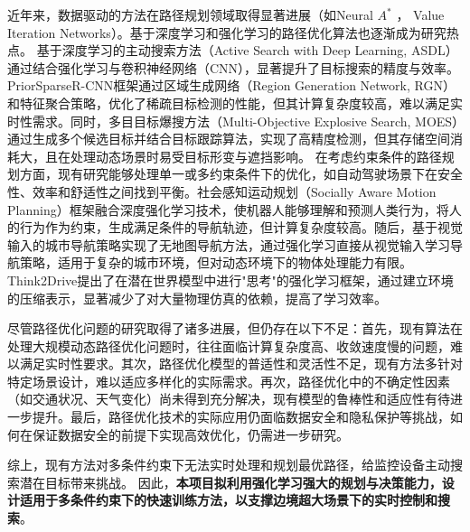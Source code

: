 近年来，数据驱动的方法在路径规划领域取得显著进展（如Neural $A^{\ast}$ \cite{Archetti_2022}， Value Iteration Networks\cite{tamar2017valueiterationnetworks}）。基于深度学习和强化学习的路径优化算法也逐渐成为研究热点\cite{zheng2023distributed,cui2024multi,fang2024improved}。
基于深度学习的主动搜索方法\cite{DBLP:conf/iclr/HottungKT22}（Active Search with Deep Learning, ASDL）通过结合强化学习与卷积神经网络（CNN），显著提升了目标搜索的精度与效率。
PriorSparseR-CNN框架\cite{wang2024priorsparse}通过区域生成网络（Region Generation Network, RGN）和特征聚合策略，优化了稀疏目标检测的性能，但其计算复杂度较高，难以满足实时性需求。同时，多目目标爆搜方法（Multi-Objective Explosive Search, MOES）\cite{moes2024}通过生成多个候选目标并结合目标跟踪算法，实现了高精度检测，但其存储空间消耗大，且在处理动态场景时易受目标形变与遮挡影响。
在考虑约束条件的路径规划方面，现有研究能够处理单一或多约束条件下的优化，如自动驾驶场景下在安全性、效率和舒适性之间找到平衡\cite{yang2019generalizedalgorithmmultiobjectivereinforcement}。社会感知运动规划\cite{DBLP:conf/iros/ChenELH17}（Socially Aware Motion Planning）框架融合深度强化学习技术，使机器人能够理解和预测人类行为，将人的行为作为约束，生成满足条件的导航轨迹，但计算复杂度较高。随后，基于视觉输入的城市导航策略\cite{mirowski2019learningnavigatecitiesmap}实现了无地图导航方法，通过强化学习直接从视觉输入学习导航策略，适用于复杂的城市环境，但对动态环境下的物体处理能力有限。
Think2Drive\cite{li2024think2driveefficientreinforcementlearning}提出了在潜在世界模型中进行"思考"的强化学习框架，通过建立环境的压缩表示，显著减少了对大量物理仿真的依赖，提高了学习效率。

尽管路径优化问题的研究取得了诸多进展，但仍存在以下不足：首先，现有算法在处理大规模动态路径优化问题时，往往面临计算复杂度高、收敛速度慢的问题，难以满足实时性要求。其次，路径优化模型的普适性和灵活性不足，现有方法多针对特定场景设计，难以适应多样化的实际需求。再次，路径优化中的不确定性因素（如交通状况、天气变化）尚未得到充分解决，现有模型的鲁棒性和适应性有待进一步提升。最后，路径优化技术的实际应用仍面临数据安全和隐私保护等挑战，如何在保证数据安全的前提下实现高效优化，仍需进一步研究。

综上，现有方法对多条件约束下无法实时处理和规划最优路径，给监控设备主动搜索潜在目标带来挑战。
因此，\textbf{本项目拟利用强化学习强大的规划与决策能力，设计适用于多条件约束下的快速训练方法，以支撑边境超大场景下的实时控制和搜索}。

